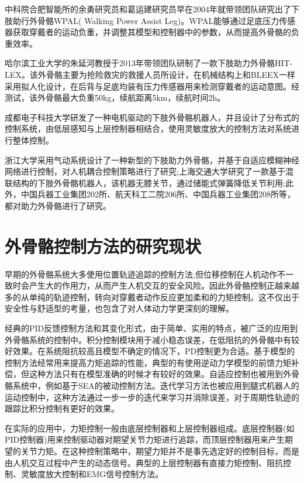 中科院合肥智能所的余勇研究员和葛运建研究员早在2004年就带领团队研究出了下肢助行外骨骼WPAL\cite{p14}( Walking Power Assist Leg)。WPAL能够通过足底压力传感器获取穿戴者的运动负重，并调整其模型和控制器中的参数，从而提高外骨骼的负重效率\cite{p15}。

哈尔滨工业大学的朱延河教授于2013年带领团队研制了一款下肢助力外骨骼HIT-LEX\cite{p18}。该外骨骼主要为抢险救灾的救援人员所设计，在机械结构上和BLEEX一样采用拟人化设计，在后背与足底均装有压力传感器用来检测穿戴者的运动意图。经测试，该外骨骼最大负重50kg，续航距离5km，续航时间2h。

成都电子科技大学研发了一种电机驱动的下肢外骨骼机器人，并且设计了分布式的控制系统，由低层感知与上层控制器相结合，使用灵敏度放大的控制方法对系统进行整体控制\cite{p19}。

浙江大学采用气动系统设计了一种新型的下肢助力外骨骼，并基于自适应模糊神经网络进行控制，对人机耦合控制策略进行了研究\cite{p17};上海交通大学研究了一款基于混联结构的下肢外骨骼机器人，该机器无膝关节，通过储能式弹簧降低关节利用\cite{p20};此外，中国兵器工业集团202所、航天科工二院206所、中国兵器工业集团208所等，都对助力外骨骼进行了研究。

\section{外骨骼控制方法的研究现状}

早期的外骨骼系统大多使用位置轨迹追踪的控制方法\cite{p21,p22},但位移控制在人机动作不一致时会产生大的作用力，从而产生人机交互的安全风险。因此外骨骼控制正越来越多的从单纯的轨迹控制，转向对穿戴者动作反应更加柔和的力矩控制。这不仅出于安全性与舒适型的考量，也包含了对人体动力学更深刻的理解\cite{p23,p24}。

经典的PID反馈控制方法和其变化形式，由于简单、实用的特点，被广泛的应用到外骨骼系统的控制中。积分控制模块用于减小稳态误差，在低阻抗的外骨骼中有较好效果\cite{p25}。在系统阻抗较高且模型不确定的情况下，PD控制更为合适\cite{p27,p28}。基于模型的控制方法经常用来提高力矩追踪的性能，典型的有使用逆动力学模型的前馈力矩补偿\cite{p29}，但这种方法只有在模型准确的时候才有较好的效果。自适应控制也被用到外骨骼系统中，例如基于SEA的被动控制方法\cite{p30}。迭代学习方法也被应用到腿式机器人的运动控制中\cite{p31}，这种方法通过一步一步的迭代来学习并消除误差，对于周期性轨迹的跟踪比积分控制有更好的效果。

在实际的应用中，力矩控制一般由底层控制器和上层控制器组成。底层控制器(如PID控制器)用来控制驱动器对期望关节力矩进行追踪，而顶层控制器用来产生期望的关节力矩。在这种控制策略中，期望力矩并不是事先选定好的控制目标，而是由人机交互过程中产生的动态信号。典型的上层控制器有直接力矩控制、阻抗控制、灵敏度放大控制和EMG信号控制方法。

